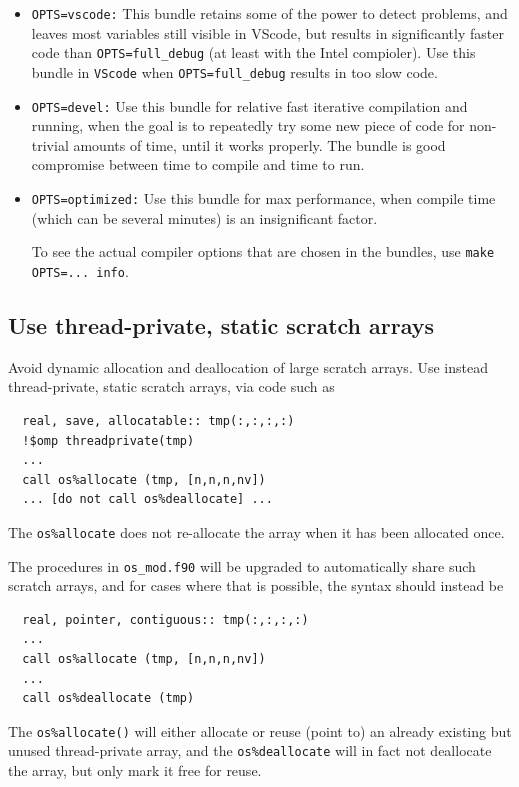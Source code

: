 \documentclass[paper=a4,fontsize=11pt]{scrartcl}
\numberwithin{equation}{section}		%
\numberwithin{figure}{section}			%
\numberwithin{table}{section}				%
\newcommand{\codecolor}{\color{Blue}}
\newcommand{\Code}[1]{{\codecolor\texttt{#1}}}
\begin{document}
\begin{itemize}
\item \Code{OPTS=vscode:} This bundle retains some of the power to detect problems, and leaves most variables still visible in VScode, but results in significantly faster code than \Code{OPTS=full\_debug} (at least with the Intel compioler).  Use this bundle in \verb'VScode' when \Code{OPTS=full\_debug} results in too slow code.

\item \Code{OPTS=devel:} Use this bundle for relative fast iterative compilation and running, when the goal is to repeatedly try some new piece of code for non-trivial amounts of time, until it works properly.  The bundle is good compromise between time to compile and time to run.

\item \Code{OPTS=optimized:} Use this bundle for max performance, when compile time (which can be several minutes) is an insignificant factor.

To see the actual compiler options that are chosen in the bundles, use \verb|make OPTS=... info|.

\end{itemize}

\subsection{Use thread-private, static scratch arrays}
Avoid dynamic allocation and deallocation of large scratch arrays.  Use instead thread-private, static scratch arrays, via code such as
\begin{verbatim}
  real, save, allocatable:: tmp(:,:,:,:)
  !$omp threadprivate(tmp)
  ...
  call os%allocate (tmp, [n,n,n,nv])
  ... [do not call os%deallocate] ...
\end{verbatim}
The \verb|os%allocate| does not re-allocate the array when it has been allocated once.

The procedures in \verb|os_mod.f90| will be upgraded to automatically share such scratch arrays, and for cases where that is possible, the syntax should instead be
\begin{verbatim}
  real, pointer, contiguous:: tmp(:,:,:,:)
  ...
  call os%allocate (tmp, [n,n,n,nv])
  ...
  call os%deallocate (tmp)
\end{verbatim}
The \verb|os%allocate()| will either allocate or reuse (point to) an already existing but unused thread-private array, and the \verb|os%deallocate| will in  fact not deallocate the array, but only mark it free for reuse.
\end{document}
